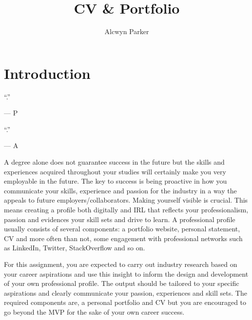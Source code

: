 \documentclass{../../fal_assignment}
\title{CV \& Portfolio}
\author{Alcwyn Parker}
\begin{document}
\maketitle

\section*{Introduction}

\begin{marginquote}
``.''

--- P

    \marginquoterule

``.''

--- A

\end{marginquote}


A degree alone does not guarantee success in the future but the skills and experiences acquired throughout your studies will certainly make you very employable in the future. The key to success is being proactive in how you communicate your skills, experience and passion for the industry in a way the appeals to future employers/collaborators. Making yourself visible is crucial. This means creating a profile both digitally and IRL that reflects your 
professionalism, passion and evidences your skill sets and drive to learn. A professional profile usually consists of several components: a portfolio website, personal statement, CV and more often than not, some engagement with professional networks such as LinkedIn, Twitter, StackOverflow and so on. 

For this assignment, you are expected to carry out industry research based on your career aspirations and use this insight to inform the design and development of your own professional profile. The output should be tailored to your specific aspirations and clearly communicate your passion, experiences and skill sets. The required components are, a personal portfolio and CV but you are encouraged to go beyond the MVP for the sake of your own career success. 
\end{document}
